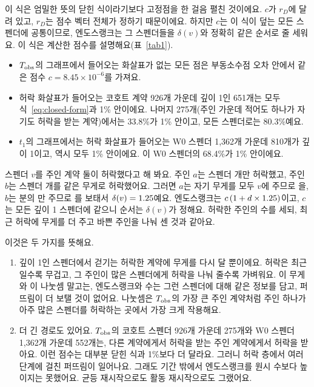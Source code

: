 이 식은 엄밀한 뜻의 닫힌 식이라기보다 고정점을 한 걸음 펼친 것이에요. $c$가 $r_D$에 달려 있고, $r_D$는 점수 벡터 전체가 정하기 때문이에요. 하지만 $c$는 이 식이 덮는 모든 스펜더에 공통이므로, 엔도스랭크는 그 스펜더들을 $\delta(v)$와 정확히 같은 순서로 줄 세워요. 이 식은 계산한 점수를 설명해요(표~\ref{tab1}).
\begin{itemize}
\item $T_{\mathrm{obs}}$의 그래프에서 들어오는 화살표가 없는 모든 점은 부동소수점 오차 안에서 같은 점수 $c=8.45\times10^{-6}$를 가져요.
\item 허락 화살표가 들어오는 코호트 계약 926개 가운데 깊이 1인 651개는 모두 식~\eqref{eq:closed-form}과 1\% 안이에요. 나머지 275개(주인 가운데 적어도 하나가 자기도 허락을 받는 계약)에서는 33.8\%가 1\% 안이고, 모든 스펜더로는 80.3\%예요.
\item $t_1$의 그래프에서는 허락 화살표가 들어오는 W0 스펜더 1,362개 가운데 810개가 깊이 1이고, 역시 모두 1\% 안이에요. 이 W0 스펜더의 68.4\%가 1\% 안이에요.
\end{itemize}

\begin{puri}[$\delta(v)$를 작은 예로 보면]
스펜더 $v$를 주인 계약 둘이 허락했다고 해 봐요. 주인 $a$는 스펜더 개만 허락했고, 주인 $b$는 스펜더 개를 같은 무게로 허락했어요. 그러면 $a$는 자기 무게를 모두 $v$에 주므로 을, $b$는 분의 만 주므로 를 보태서 $\delta(v)=1.25$예요. 엔도스랭크는 $c\,(1+d\times1.25)$이고, $c$는 모든 깊이 1 스펜더에 같으니 순서는 $\delta(v)$가 정해요. 허락한 주인의 수를 세되, 최근 허락에 무게를 더 주고 바쁜 주인을 나눠 센 것과 같아요.
\end{puri}

이것은 두 가지를 뜻해요.
\begin{enumerate}
\item 깊이 1인 스펜더에서 걷기는 허락한 계약에 무게를 다시 달 뿐이에요. 허락은 최근일수록 무겁고, 그 주인이 많은 스펜더에게 허락을 나눠 줄수록 가벼워요. 이 무게와 이 나눗셈 말고는, 엔도스랭크와 수는 그런 스펜더에 대해 같은 정보를 담고, 퍼뜨림이 더 보탤 것이 없어요. 나눗셈은 $T_{\mathrm{obs}}$의 가장 큰 주인 계약처럼 주인 하나가 아주 많은 스펜더를 허락하는 곳에서 가장 크게 작용해요.
\item 더 긴 경로도 있어요. $T_{\mathrm{obs}}$의 코호트 스펜더 926개 가운데 275개와 W0 스펜더 1,362개 가운데 552개는, 다른 계약에게서 허락을 받는 주인 계약에게서 허락을 받아요. 이런 점수는 대부분 닫힌 식과 1\%보다 더 달라요. 그러니 허락 층에서 여러 단계에 걸친 퍼뜨림이 일어나요. 그래도 기간 밖에서 엔도스랭크를 원시 수보다 높이지는 못했어요. 균등 재시작으로도 활동 재시작으로도 그랬어요.
\end{enumerate}

